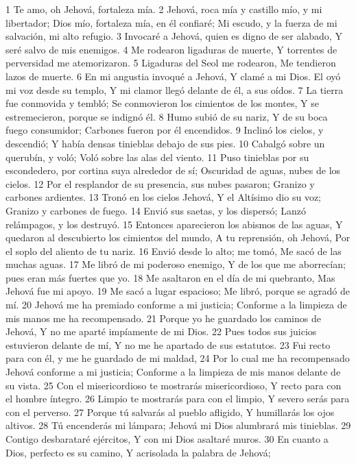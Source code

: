 1 Te amo, oh Jehová, fortaleza mía.
2 Jehová, roca mía y castillo mío, y mi libertador;
Dios mío, fortaleza mía, en él confiaré;
Mi escudo, y la fuerza de mi salvación, mi alto refugio.
3 Invocaré a Jehová, quien es digno de ser alabado,
Y seré salvo de mis enemigos.
4 Me rodearon ligaduras de muerte,
Y torrentes de perversidad me atemorizaron.
5 Ligaduras del Seol me rodearon,
Me tendieron lazos de muerte.
6 En mi angustia invoqué a Jehová,
Y clamé a mi Dios.
El oyó mi voz desde su templo,
Y mi clamor llegó delante de él, a sus oídos.
7 La tierra fue conmovida y tembló;
Se conmovieron los cimientos de los montes,
Y se estremecieron, porque se indignó él.
8 Humo subió de su nariz,
Y de su boca fuego consumidor;
Carbones fueron por él encendidos.
9 Inclinó los cielos, y descendió;
Y había densas tinieblas debajo de sus pies.
10 Cabalgó sobre un querubín, y voló;
Voló sobre las alas del viento.
11 Puso tinieblas por su escondedero, por cortina suya alrededor de sí;
Oscuridad de aguas, nubes de los cielos.
12 Por el resplandor de su presencia, sus nubes pasaron;
Granizo y carbones ardientes.
13 Tronó en los cielos Jehová,
Y el Altísimo dio su voz;
Granizo y carbones de fuego.
14 Envió sus saetas, y los dispersó;
Lanzó relámpagos, y los destruyó.
15 Entonces aparecieron los abismos de las aguas,
Y quedaron al descubierto los cimientos del mundo,
A tu reprensión, oh Jehová,
Por el soplo del aliento de tu nariz.
16 Envió desde lo alto; me tomó,
Me sacó de las muchas aguas.
17 Me libró de mi poderoso enemigo,
Y de los que me aborrecían; pues eran más fuertes que yo.
18 Me asaltaron en el día de mi quebranto,
Mas Jehová fue mi apoyo.
19 Me sacó a lugar espacioso;
Me libró, porque se agradó de mí.
20 Jehová me ha premiado conforme a mi justicia;
Conforme a la limpieza de mis manos me ha recompensado.
21 Porque yo he guardado los caminos de Jehová,
Y no me aparté impíamente de mi Dios.
22 Pues todos sus juicios estuvieron delante de mí,
Y no me he apartado de sus estatutos.
23 Fui recto para con él, y me he guardado de mi maldad,
24 Por lo cual me ha recompensado Jehová conforme a mi justicia;
Conforme a la limpieza de mis manos delante de su vista.
25 Con el misericordioso te mostrarás misericordioso,
Y recto para con el hombre íntegro.
26 Limpio te mostrarás para con el limpio,
Y severo serás para con el perverso.
27 Porque tú salvarás al pueblo afligido,
Y humillarás los ojos altivos.
28 Tú encenderás mi lámpara;
Jehová mi Dios alumbrará mis tinieblas.
29 Contigo desbarataré ejércitos,
Y con mi Dios asaltaré muros.
30 En cuanto a Dios, perfecto es su camino,
Y acrisolada la palabra de Jehová;

